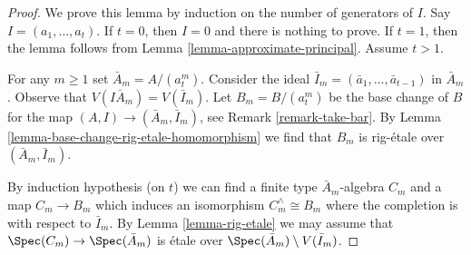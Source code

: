 \begin{proof}
We prove this lemma by induction on the number of generators of $I$.
Say $I = (a_1, \ldots, a_t)$. If $t = 0$, then $I = 0$ and there
is nothing to prove. If $t = 1$, then the lemma follows from
Lemma \ref{lemma-approximate-principal}. Assume $t > 1$.

\medskip\noindent
For any $m \geq 1$ set $\bar A_m = A/(a_t^m)$. Consider the ideal
$\bar I_m = (\bar a_1, \ldots, \bar a_{t - 1})$ in $\bar A_m$.
Observe that $V(I \bar A_m) = V(\bar I_m)$.
Let $B_m = B/(a_t^m)$ be the base change of $B$ for the
map $(A, I) \to (\bar A_m, \bar I_m)$, see Remark \ref{remark-take-bar}.
By Lemma \ref{lemma-base-change-rig-etale-homomorphism}
we find that $B_m$ is rig-\'etale over $(\bar A_m, \bar I_m)$.

\medskip\noindent
By induction hypothesis (on $t$) we can find a finite type
$\bar A_m$-algebra $C_m$ and a map $C_m \to B_m$ which induces an
isomorphism $C_m^\wedge \cong B_m$
where the completion is with respect to $\bar I_m$.
By Lemma \ref{lemma-rig-etale} we may assume that
$\Spec(C_m) \to \Spec(\bar A_m)$ is \'etale
over $\Spec(\bar A_m) \setminus V(\bar I_m)$.


\end{proof}
